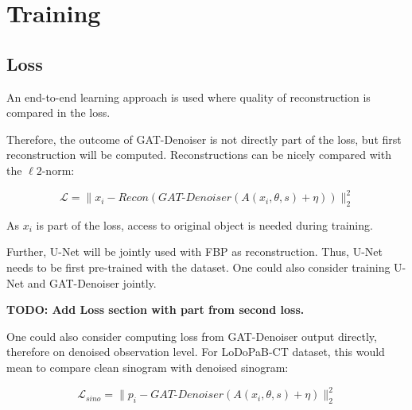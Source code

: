 \section{Training}

\subsection{Loss}

\label{sec:contr_training}
An end-to-end learning approach is used where quality of reconstruction is 
compared in the loss.

Therefore, the outcome of GAT-Denoiser is not directly part of the loss, but first reconstruction will be computed.
Reconstructions can be nicely compared with the $\ell2$-norm:

\begin{equation}
  \label{eq:loss_reco}
  \mathcal{L} = \parallel x_i - \textit{Recon} ( \textit{GAT-Denoiser}(A(x_i, \theta, s) + \eta)) \parallel ^2_2
\end{equation}

As $x_i$ is part of the loss, access to original object is needed during training.

Further, U-Net will be jointly used with FBP as reconstruction. 
Thus, U-Net needs to be first pre-trained with the dataset.
One could also consider training U-Net and GAT-Denoiser jointly.

\textbf{TODO: Add Loss section with part from second loss.}


One could also consider computing loss from GAT-Denoiser output directly, therefore on denoised observation level.
For LoDoPaB-CT dataset, this would mean to compare clean sinogram with denoised sinogram:

\begin{equation}
  \label{eq:loss_sino}
  \mathcal{L}_{sino} = \parallel p_i - \textit{GAT-Denoiser}(A(x_i, \theta, s) + \eta) \parallel ^2_2
\end{equation}
